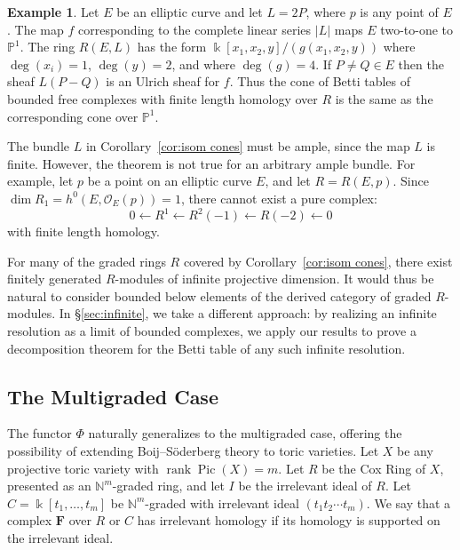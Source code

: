 \documentclass[12pt]{amsart}
\theoremstyle{definition}
\newtheorem{example}[lemma]{Example}
\theoremstyle{remark}
\newcommand{\Pic}{\operatorname{Pic}}
\newcommand{\kk}{\Bbbk}
\newcommand{\rank}{\operatorname{rank}}
\newcommand{\cO}{\mathcal{O}}
\newcommand{\FF}{\mathbf{F}}
\newcommand{\defi}[1]{\textsf{#1}} %
\newcommand{\daniel}[1]{{\color{green} \sf $\clubsuit\clubsuit\clubsuit$ Daniel: [#1]}}
\newcommand{\david}[1]{{\color{red} \sf $\clubsuit\clubsuit\clubsuit$ David: [#1]}}
\renewcommand{\P}{{\mathbb P}}
\begin{document}
\begin{example}\label{ex:elliptic}
Let $E$ be an elliptic curve and let $L=2P$, where $p$ is any point of $E$.  The map $f$ corresponding to the complete
linear series $|L|$ maps $E$ two-to-one to $\P^{1}$. The ring $R(E,L)$ has the form
$\kk[x_1,x_2,y]/(g(x_{1},x_{2},y))$  where $\deg(x_i)=1$, $\deg(y)=2$, and where $\deg(g)=4$.
%
%
If $P\neq Q\in E$ then the sheaf $L(P-Q)$ is an Ulrich sheaf for $f$. Thus the cone of
Betti tables of bounded free complexes with finite length homology over $R$ is the same
as the corresponding cone over $\P^{1}$.

The bundle $L$ in Corollary~\ref{cor:isom cones} must be ample, since the map $L$ is finite.  However, the theorem is not true for an arbitrary ample bundle.  For example, let $p$ be a point on an elliptic curve $E$, and let $R=R(E,p)$.  Since $\dim R_1=h^0(E,\cO_E(p))=1$, there cannot exist a pure complex:
\[
0\gets R^1\gets R^2(-1)\gets R(-2)\gets 0
\]
with finite length homology.
\end{example}

For many of the graded rings $R$ covered by Corollary~\ref{cor:isom cones}, there exist finitely generated $R$-modules of infinite projective dimension.  It would thus be natural to consider bounded below elements of the derived category of graded $R$-modules.  In \S\ref{sec:infinite}, we take a different approach: by realizing an infinite resolution as a limit of bounded complexes, we apply our results to prove a decomposition theorem for the Betti table of any such infinite resolution.

\subsection*{The Multigraded Case}
The functor $\Phi$ naturally generalizes to the multigraded case, offering the possibility of extending Boij--S\"oderberg theory to toric varieties.  Let $X$ be any projective toric variety with $\rank \Pic(X)=m$.  Let $R$ be the Cox Ring of $X$, presented as an $\mathbb N^m$-graded ring, and let $I$ be the irrelevant ideal of $R$.  Let $C=\kk[t_1, \dots, t_m]$ be $\mathbb N^m$-graded with irrelevant ideal $(t_1t_2\cdots t_m)$.  We say that a complex $\FF$ over $R$ or $C$ has \defi{irrelevant homology} if its homology is supported on the irrelevant ideal.
\end{document}
